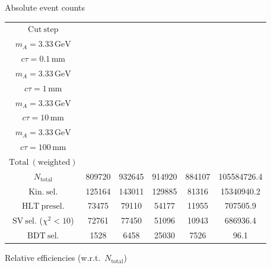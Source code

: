 \documentclass[10pt,a4paper]{article}
\renewcommand{\arraystretch}{1.4}
\begin{document}
{\footnotesize\setlength{\tabcolsep}{4pt}\renewcommand{\arraystretch}{1.05}%
\vspace{12pt}

Absolute event counts

\begin{tabular}{cccccc}
\toprule
$\mathrm{Cut\ step}$ & \shortstack{$m_{\pi}=10\,\mathrm{GeV}$\\$m_{A}=3.33\,\mathrm{GeV}$\\$c\tau=0.1\,\mathrm{mm}$} & \shortstack{$m_{\pi}=10\,\mathrm{GeV}$\\$m_{A}=3.33\,\mathrm{GeV}$\\$c\tau=1\,\mathrm{mm}$} & \shortstack{$m_{\pi}=10\,\mathrm{GeV}$\\$m_{A}=3.33\,\mathrm{GeV}$\\$c\tau=10\,\mathrm{mm}$} & \shortstack{$m_{\pi}=10\,\mathrm{GeV}$\\$m_{A}=3.33\,\mathrm{GeV}$\\$c\tau=100\,\mathrm{mm}$} & \shortstack{$\mathrm{QCD}$\\$\mathrm{Total\ (weighted)}$} \\
\midrule
$N_{\mathrm{total}}$ & 809720 & 932645 & 914920 & 884107 & 105584726.4\\
$\mathrm{Kin.\ sel.}$ & 125164 & 143011 & 129885 & 81316 & 15340940.2\\
$\mathrm{HLT\ presel.}$ & 73475 & 79110 & 54177 & 11955 & 707505.9\\
$\mathrm{SV\ sel.}$ ($\chi^2{<}10$) & 72761 & 77450 & 51096 & 10943 & 686936.4\\
$\mathrm{BDT\ sel.}$ & 1528 & 6458 & 25030 & 7526 & 96.1\\
\bottomrule
\end{tabular}

\vspace{18pt}

Relative efficiencies (w.r.t.\ $N_{\mathrm{total}}$)

}
\end{document}
